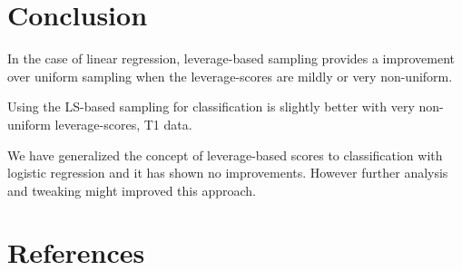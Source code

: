 \section{Conclusion}
In the case of linear regression, leverage-based sampling provides a improvement over uniform sampling when the leverage-scores are mildly or very non-uniform.

Using the LS-based sampling for classification is slightly better with very non-uniform leverage-scores, T1 data.

We have generalized the concept of leverage-based scores to classification with logistic regression and it has shown no improvements. However further analysis and tweaking might improved this approach.

\section{References}
%
\vspace{-2.5cm}



